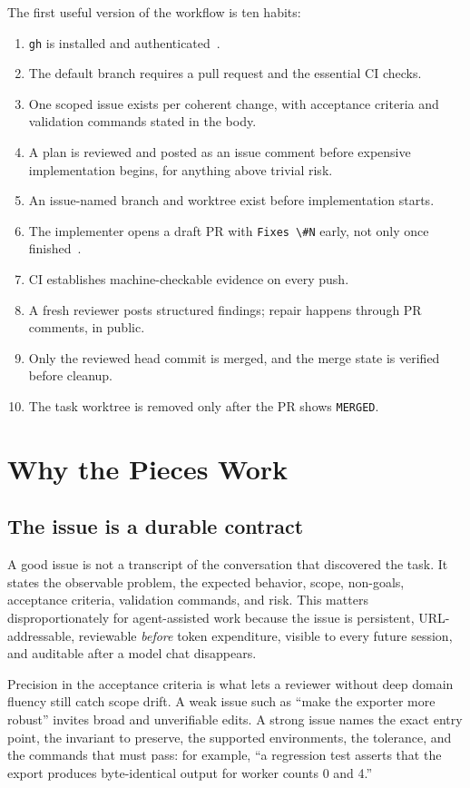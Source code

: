 \documentclass[11pt]{article}
\newcommand{\co}[1]{\lstinline[basicstyle=\ttfamily\color{gwInk}]{#1}}
\begin{document}
The first useful version of the workflow is ten habits:

\begin{enumerate}
  \item \co{gh} is installed and authenticated~\cite{github2026cli}.
  \item The default branch requires a pull request and the essential CI checks.
  \item One scoped issue exists per coherent change, with acceptance criteria and validation
    commands stated in the body.
  \item A plan is reviewed and posted as an issue comment before expensive implementation begins,
    for anything above trivial risk.
  \item An issue-named branch and worktree exist before implementation starts.
  \item The implementer opens a draft PR with \co{Fixes \#N} early, not only once
    finished~\cite{github2026linking}.
  \item CI establishes machine-checkable evidence on every push.
  \item A fresh reviewer posts structured findings; repair happens through PR comments, in public.
  \item Only the reviewed head commit is merged, and the merge state is verified before cleanup.
  \item The task worktree is removed only after the PR shows \co{MERGED}.
\end{enumerate}

\section{Why the Pieces Work}

\subsection{The issue is a durable contract}

A good issue is not a transcript of the conversation that discovered the task. It states the
observable problem, the expected behavior, scope, non-goals, acceptance criteria, validation
commands, and risk. This matters disproportionately for agent-assisted work because the issue is
persistent, URL-addressable, reviewable \emph{before} token expenditure, visible to every future
session, and auditable after a model chat disappears.

Precision in the acceptance criteria is what lets a reviewer without deep domain fluency still
catch scope drift. A weak issue such as ``make the exporter more robust'' invites broad and
unverifiable edits. A strong issue names the exact entry point, the invariant to preserve, the
supported environments, the tolerance, and the commands that must pass: for example, ``a
regression test asserts that the export produces byte-identical output for worker counts 0 and
4.''
\end{document}
